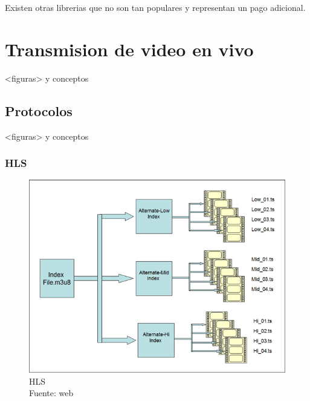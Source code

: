 Existen otras librerias que no son tan populares y representan un pago adicional.

\section{Transmision de video en vivo}
<figuras> y conceptos

\subsection{Protocolos}
<figuras> y conceptos

\subsubsection{HLS}
\begin{figure}[H]
    \begin{center}
        \includegraphics[width=12cm]{img/capitulo_2/hls.jpg}
    \end{center}
    \caption{HLS\\Fuente: web}
    \label{fig:classical_ml}
\end{figure}

